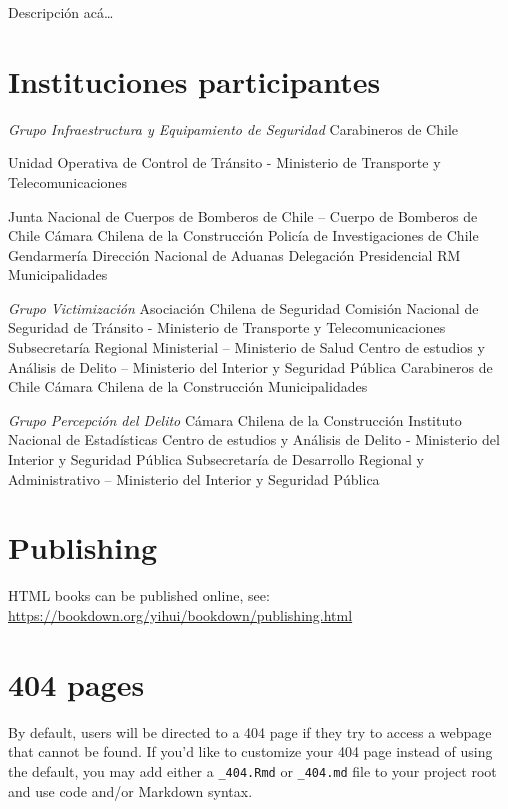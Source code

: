 \documentclass[
]{book}
\theoremstyle{definition}
\theoremstyle{definition}
\theoremstyle{definition}
\theoremstyle{definition}
\theoremstyle{remark}
\begin{document}
Descripción acá\ldots{}

\hypertarget{instituciones-participantes-5}{%
\section*{Instituciones participantes}\label{instituciones-participantes-5}}

\emph{Grupo Infraestructura y Equipamiento de Seguridad}
Carabineros de Chile

Unidad Operativa de Control de Tránsito - Ministerio de Transporte y Telecomunicaciones

Junta Nacional de Cuerpos de Bomberos de Chile -- Cuerpo de Bomberos de Chile
Cámara Chilena de la Construcción
Policía de Investigaciones de Chile
Gendarmería
Dirección Nacional de Aduanas
Delegación Presidencial RM
Municipalidades

\emph{Grupo Victimización}
Asociación Chilena de Seguridad
Comisión Nacional de Seguridad de Tránsito - Ministerio de Transporte y Telecomunicaciones
Subsecretaría Regional Ministerial -- Ministerio de Salud
Centro de estudios y Análisis de Delito -- Ministerio del Interior y Seguridad Pública
Carabineros de Chile
Cámara Chilena de la Construcción
Municipalidades

\emph{Grupo Percepción del Delito}
Cámara Chilena de la Construcción
Instituto Nacional de Estadísticas
Centro de estudios y Análisis de Delito - Ministerio del Interior y Seguridad Pública
Subsecretaría de Desarrollo Regional y Administrativo -- Ministerio del Interior y Seguridad Pública

\hypertarget{publishing}{%
\section*{Publishing}\label{publishing}}

HTML books can be published online, see: \url{https://bookdown.org/yihui/bookdown/publishing.html}

\hypertarget{pages}{%
\section*{404 pages}\label{pages}}

By default, users will be directed to a 404 page if they try to access a webpage that cannot be found. If you'd like to customize your 404 page instead of using the default, you may add either a \texttt{\_404.Rmd} or \texttt{\_404.md} file to your project root and use code and/or Markdown syntax.
\end{document}
